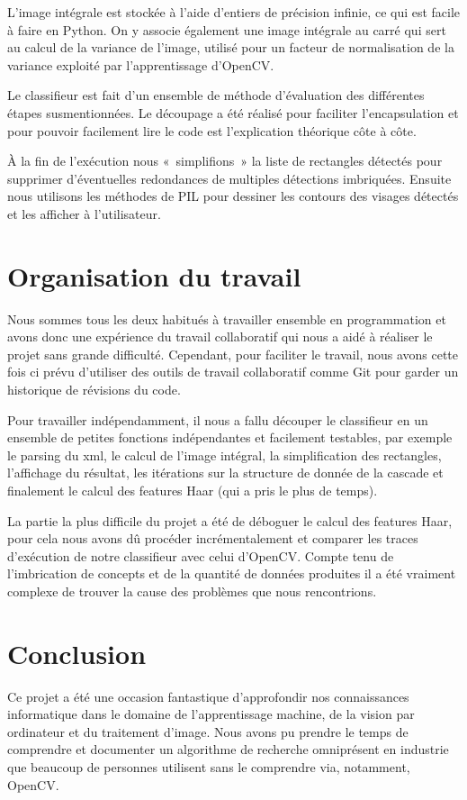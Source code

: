 \documentclass[a4paper,11pt]{report}
\begin{document}
	L’image intégrale est stockée à l’aide d’entiers de précision infinie, ce qui est facile à faire en Python. On y associe également une image intégrale au carré qui sert au calcul de la variance de l’image, utilisé pour un facteur de normalisation de la variance exploité par l’apprentissage d’OpenCV.

	Le classifieur est fait d’un ensemble de méthode d’évaluation des différentes étapes susmentionnées. Le découpage a été réalisé pour faciliter l’encapsulation et pour pouvoir facilement lire le code est l’explication théorique côte à côte.

	À la fin de l’exécution nous « simplifions » la liste de rectangles détectés pour supprimer d’éventuelles redondances de multiples détections imbriquées. Ensuite nous utilisons les méthodes de PIL pour dessiner les contours des visages détectés et les afficher à l’utilisateur.

\chapter{Organisation du travail}
	Nous sommes tous les deux habitués à travailler ensemble en programmation et avons donc une expérience du travail collaboratif qui nous a aidé à réaliser le projet sans grande difficulté. Cependant, pour faciliter le travail, nous avons cette fois ci prévu d’utiliser des outils de travail collaboratif comme Git pour garder un historique de révisions du code. 

	Pour travailler indépendamment, il nous a fallu découper le classifieur en un ensemble de petites fonctions indépendantes et facilement testables, par exemple le parsing du xml, le calcul de l’image intégral, la simplification des rectangles, l’affichage du résultat, les itérations sur la structure de donnée de la cascade et finalement le calcul des features Haar (qui a pris le plus de temps).

	La partie la plus difficile du projet a été de déboguer le calcul des features Haar, pour cela nous avons dû procéder incrémentalement et comparer les traces d’exécution de notre classifieur avec celui d’OpenCV. Compte tenu de l’imbrication de concepts et de la quantité de données produites il a été vraiment complexe de trouver la cause des problèmes que nous rencontrions.
	
\chapter{Conclusion}
		Ce projet a été une occasion fantastique d’approfondir nos connaissances informatique dans le domaine de l’apprentissage machine, de la vision par ordinateur et du traitement d’image. Nous avons pu prendre le temps de comprendre et documenter un algorithme de recherche omniprésent en industrie que beaucoup de personnes utilisent sans le comprendre via, notamment, OpenCV.
\end{document}
